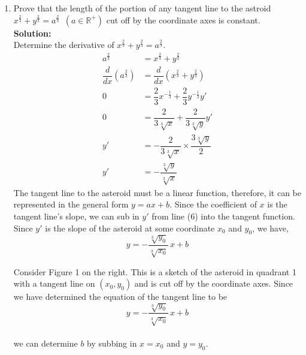 \documentclass[12pt]{book}
\begin{document}
\begin{enumerate}

\item Prove that the length of the portion of any tangent line to the astroid $x^{\frac{2}{3}} + y^{\frac{2}{3}} = a^{\frac{2}{3}} \,\,\,(a \in \mathbb{R}^+)$ cut off by the coordinate axes is constant.\\

\textbf{Solution:}\\
Determine the derivative of $x^{\frac{2}{3}} + y^{\frac{2}{3}} = a^{\frac{2}{3}}$.
\setcounter{equation}{0}
\begin{align}
    a^{\frac{2}{3}} &= x^{\frac{2}{3}} + y^{\frac{2}{3}} \\
    \dfrac{d}{dx} \left(a^{\frac{2}{3}}\right) &= \dfrac{d}{dx} \left(x^{\frac{2}{3}} + y^{\frac{2}{3}}\right) \\
    0 &= \dfrac{2}{3} x^{-\frac{1}{3}} + \dfrac{2}{3} y^{-\frac{1}{3}}y' \\
    0 &= \dfrac{2}{3\sqrt[3]{x}} + \dfrac{2}{3\sqrt[3]{y}}y' \\
    y' &= -\dfrac{2}{3\sqrt[3]{x}} \times \dfrac{3\sqrt[3]{y}}{2} \\
    y' &= -\dfrac{\sqrt[3]{y}}{\sqrt[3]{x}}
\end{align}
The tangent line to the asteroid must be a linear function, therefore, it can be represented in the general form $y = ax + b$. Since the coefficient of $x$ is the tangent line's slope, we can sub in $y'$ from line (6) into the tangent function. Since $y'$ is the slope of the asteroid at some coordinate $x_0$ and $y_0$, we have, $$y = -\dfrac{\sqrt[3]{y_0}}{\sqrt[3]{x_0}}\,x + b$$
\begin{minipage}{0.5\textwidth}
    Consider Figure 1 on the right. This is a sketch of the asteroid in quadrant 1 with a tangent line on $(x_0, y_0)$ and is cut off by the coordinate axes. Since we have determined the equation of the tangent line to be\\ $$y = -\dfrac{\sqrt[3]{y_0}}{\sqrt[3]{x_0}}\,x + b$$\\ we can determine $b$ by subbing in $x=x_0$ and $y=y_0$.
\end{minipage}
\begin{minipage}{0.5\textwidth}
    \begin{figure}[H] %

\end{figure}
\end{minipage}
\end{enumerate}
\end{document}
